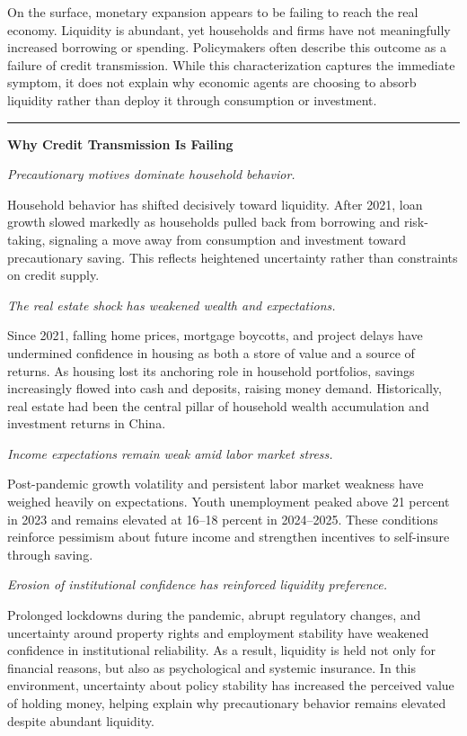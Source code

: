 \documentclass[11pt,letterpaper]{article}
\begin{document}
On the surface, monetary expansion appears to be failing to reach the real economy. Liquidity is abundant, yet households and firms have not meaningfully increased borrowing or spending. Policymakers often describe this outcome as a failure of credit transmission. While this characterization captures the immediate symptom, it does not explain why economic agents are choosing to absorb liquidity rather than deploy it through consumption or investment.

\noindent\rule{\textwidth}{0.4pt}

\textbf{Why Credit Transmission Is Failing}

\textit{Precautionary motives dominate household behavior.}

Household behavior has shifted decisively toward liquidity. After 2021, loan growth slowed markedly as households pulled back from borrowing and risk-taking, signaling a move away from consumption and investment toward precautionary saving. This reflects heightened uncertainty rather than constraints on credit supply.

\textit{The real estate shock has weakened wealth and expectations.}

Since 2021, falling home prices, mortgage boycotts, and project delays have undermined confidence in housing as both a store of value and a source of returns. As housing lost its anchoring role in household portfolios, savings increasingly flowed into cash and deposits, raising money demand. Historically, real estate had been the central pillar of household wealth accumulation and investment returns in China.

\textit{Income expectations remain weak amid labor market stress.}

Post-pandemic growth volatility and persistent labor market weakness have weighed heavily on expectations. Youth unemployment peaked above 21 percent in 2023 and remains elevated at 16--18 percent in 2024--2025. These conditions reinforce pessimism about future income and strengthen incentives to self-insure through saving.

\textit{Erosion of institutional confidence has reinforced liquidity preference.}

Prolonged lockdowns during the pandemic, abrupt regulatory changes, and uncertainty around property rights and employment stability have weakened confidence in institutional reliability. As a result, liquidity is held not only for financial reasons, but also as psychological and systemic insurance. In this environment, uncertainty about policy stability has increased the perceived value of holding money, helping explain why precautionary behavior remains elevated despite abundant liquidity.
\end{document}
